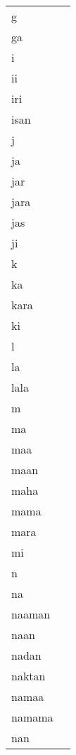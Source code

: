 \documentclass{article}
\begin{document}
\begin{longtable}{|l|p{}|}
g & \textIndus{} \\
ga & \textIndus{} \\
i & \textIndus{    } \\
ii & \textIndus{} \\
iri & \textIndus{ } \\
isan & \textIndus{} \\
j & \textIndus{   } \\
ja & \textIndus{        } \\
jar & \textIndus{} \\
jara & \textIndus{} \\
jas & \textIndus{} \\
ji & \textIndus{} \\
k & \textIndus{     } \\
ka & \textIndus{                     } \\
kara & \textIndus{} \\
ki & \textIndus{} \\
l & \textIndus{    } \\
la & \textIndus{                       } \\
lala & \textIndus{} \\
m & \textIndus{                    } \\
ma & \textIndus{                                                              } \\
maa & \textIndus{ } \\
maan & \textIndus{} \\
maha & \textIndus{} \\
mama & \textIndus{ } \\
mara & \textIndus{ } \\
mi & \textIndus{} \\
n & \textIndus{       } \\
na & \textIndus{                } \\
naaman & \textIndus{} \\
naan & \textIndus{} \\
nadan & \textIndus{} \\
naktan & \textIndus{} \\
namaa & \textIndus{  } \\
namama & \textIndus{} \\
nan & \textIndus{  } \\

\end{longtable}
\end{document}
